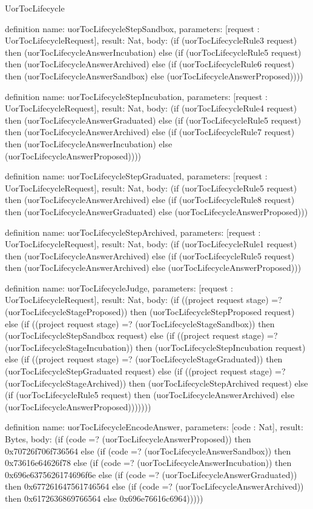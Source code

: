 \begin{lexlean}{UorTocLifecycle}
\begin{semanticmodule}
definition{
  name: uorTocLifecycleStepSandbox,
  parameters: [request : UorTocLifecycleRequest],
  result: Nat,
  body: (if (uorTocLifecycleRule3 request) then (uorTocLifecycleAnswerIncubation) else (if (uorTocLifecycleRule5 request) then (uorTocLifecycleAnswerArchived) else (if (uorTocLifecycleRule6 request) then (uorTocLifecycleAnswerSandbox) else (uorTocLifecycleAnswerProposed))))
}

definition{
  name: uorTocLifecycleStepIncubation,
  parameters: [request : UorTocLifecycleRequest],
  result: Nat,
  body: (if (uorTocLifecycleRule4 request) then (uorTocLifecycleAnswerGraduated) else (if (uorTocLifecycleRule5 request) then (uorTocLifecycleAnswerArchived) else (if (uorTocLifecycleRule7 request) then (uorTocLifecycleAnswerIncubation) else (uorTocLifecycleAnswerProposed))))
}

definition{
  name: uorTocLifecycleStepGraduated,
  parameters: [request : UorTocLifecycleRequest],
  result: Nat,
  body: (if (uorTocLifecycleRule5 request) then (uorTocLifecycleAnswerArchived) else (if (uorTocLifecycleRule8 request) then (uorTocLifecycleAnswerGraduated) else (uorTocLifecycleAnswerProposed)))
}

definition{
  name: uorTocLifecycleStepArchived,
  parameters: [request : UorTocLifecycleRequest],
  result: Nat,
  body: (if (uorTocLifecycleRule1 request) then (uorTocLifecycleAnswerArchived) else (if (uorTocLifecycleRule5 request) then (uorTocLifecycleAnswerArchived) else (uorTocLifecycleAnswerProposed)))
}

definition{
  name: uorTocLifecycleJudge,
  parameters: [request : UorTocLifecycleRequest],
  result: Nat,
  body: (if ((project request stage) =? (uorTocLifecycleStageProposed)) then (uorTocLifecycleStepProposed request) else (if ((project request stage) =? (uorTocLifecycleStageSandbox)) then (uorTocLifecycleStepSandbox request) else (if ((project request stage) =? (uorTocLifecycleStageIncubation)) then (uorTocLifecycleStepIncubation request) else (if ((project request stage) =? (uorTocLifecycleStageGraduated)) then (uorTocLifecycleStepGraduated request) else (if ((project request stage) =? (uorTocLifecycleStageArchived)) then (uorTocLifecycleStepArchived request) else (if (uorTocLifecycleRule5 request) then (uorTocLifecycleAnswerArchived) else (uorTocLifecycleAnswerProposed)))))))
}

definition{
  name: uorTocLifecycleEncodeAnswer,
  parameters: [code : Nat],
  result: Bytes,
  body: (if (code =? (uorTocLifecycleAnswerProposed)) then 0x70726f706f736564 else (if (code =? (uorTocLifecycleAnswerSandbox)) then 0x73616e64626f78 else (if (code =? (uorTocLifecycleAnswerIncubation)) then 0x696e6375626174696f6e else (if (code =? (uorTocLifecycleAnswerGraduated)) then 0x677261647561746564 else (if (code =? (uorTocLifecycleAnswerArchived)) then 0x6172636869766564 else 0x696e76616c6964)))))
}


\end{semanticmodule}
\end{lexlean}
